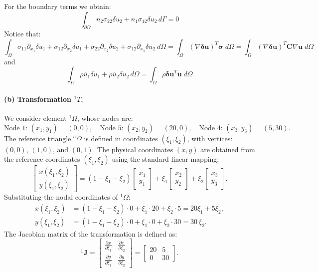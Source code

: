 \documentclass[12pt]{article}
\begin{document}
For the boundary terms we obtain:
$$\int_{\partial\Omega}n_2\sigma_{22}\delta u_2+n_1\sigma_{12}\delta u_2\, d\Gamma =  0$$
Notice that:
$$\int_\Omega\sigma_{11}\partial_{x_1}\delta u_1 +\sigma_{12} \partial_{x_2}\delta u_1 + \sigma_{22}\partial_{x_2}\delta u_2 +\sigma_{12} \partial_{x_1}\delta u_2\ d\Omega =\int_{\Omega} (\nabla \boldsymbol{\delta u})^T \boldsymbol{\sigma}\;d\Omega=\int_{\Omega} (\nabla \boldsymbol{\delta u})^T \mathbf{C} \nabla \mathbf{u}\;d\Omega$$
and
$$\int_\Omega\rho \ddot{u_{1}}\delta u_1 + \rho \ddot{u_{2}}\delta u_2\, d\Omega = \int_{\Omega} \rho \boldsymbol{\delta u}^T \ddot{\mathbf{u}} \; d\Omega$$
\paragraph*{(b) Transformation ${}^1T$.} We consider element \( {}^1\Omega \), whose nodes are:
\[
	\text{Node 1: } (x_1, y_1) = (0, 0), \quad
	\text{Node 5: } (x_2, y_2) = (20, 0), \quad
	\text{Node 4: } (x_3, y_3) = (5, 30).
\]
The reference triangle \( {}^a\Omega \) is defined in coordinates \( (\xi_1, \xi_2) \), with vertices: $(0,0)$, $(1,0)$, and $(0,1)$. The physical coordinates \( (x,y) \) are obtained from the reference coordinates \( (\xi_1, \xi_2) \) using the standard linear mapping:
\[
	\begin{bmatrix}
		x(\xi_1, \xi_2) \\
		y(\xi_1, \xi_2)
	\end{bmatrix}
	=
	(1 - \xi_1 - \xi_2)
	\begin{bmatrix}
		x_1 \\
		y_1
	\end{bmatrix}
	+
	\xi_1
	\begin{bmatrix}
		x_2 \\
		y_2
	\end{bmatrix}
	+
	\xi_2
	\begin{bmatrix}
		x_3 \\
		y_3
	\end{bmatrix}.
\]
Substituting the nodal coordinates of \( {}^1\Omega \):
\[
	\begin{aligned}
		x(\xi_1, \xi_2) & = (1 - \xi_1 - \xi_2)\cdot 0 + \xi_1 \cdot 20 + \xi_2 \cdot 5 = 20\xi_1 + 5\xi_2, \\
		y(\xi_1, \xi_2) & = (1 - \xi_1 - \xi_2)\cdot 0 + \xi_1 \cdot 0 + \xi_2 \cdot 30 = 30\
		\xi_2.
	\end{aligned}
\]
The Jacobian matrix of the transformation is defined as:
\[
	{}^1\mathbf{J} =
	\begin{bmatrix}
		\displaystyle \frac{\partial x}{\partial \xi_1} & \displaystyle \frac{\partial x}{\partial \xi_2} \\[5pt]
		\displaystyle \frac{\partial y}{\partial \xi_1} & \displaystyle \frac{\partial y}{\partial \xi_2}
	\end{bmatrix}
	=
	\begin{bmatrix}
		20 & 5  \\
		0  & 30
	\end{bmatrix}.
\]
\end{document}
